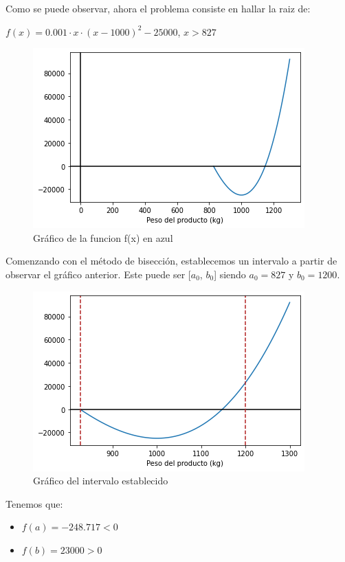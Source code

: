 Como se puede observar, ahora el problema consiste en hallar la raiz de:  

\begin{center}$f(x) = 0.001 \cdot x \cdot (x-1000)^2 - 25000$,\hspace{10mm} $x > 827$\end{center}

\begin{figure}[!ht]
	\centering
	\includegraphics[scale=0.8]{graficos/grafico_del_problema_1_planteo_para_raices.png}
	\caption{Gráfico de la funcion f(x) en azul} \label{planteo_de_raices_problema_1}
\end{figure}

Comenzando con el método de bisección, establecemos un intervalo a partir de observar el gráfico anterior. Este puede ser [$a_0$, $b_0$] siendo $a_0 = 827$ y $b_0 = 1200$.

\begin{figure}[!ht]
	\centering
	\includegraphics[scale=0.8]{graficos/zoom_en_intervalo_biseccion.png}
	\caption{Gráfico del intervalo establecido} \label{zoom_en_intervalo_biseccion}
\end{figure}

Tenemos que:
\begin{itemize}
    \item $f(a) = -248.717 < 0 $
    \item $f(b) = 23000 > 0 $
\end{itemize}

